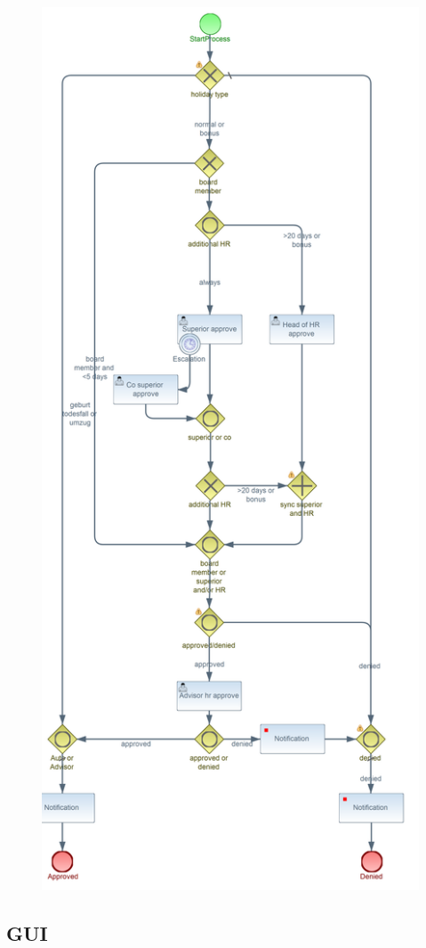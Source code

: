 \begin{figure}
\centering
\includegraphics[width=0.7\linewidth]{Bilder/Urlaubsantrag}
\caption{}
\label{fig:Urlaubsantrag}
\end{figure}


\subsection{GUI}